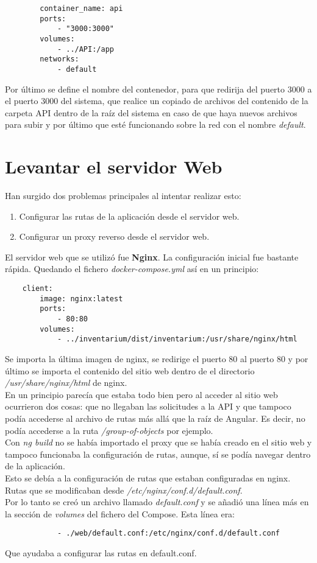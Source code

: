 \begin{verbatim}
        container_name: api
        ports:
            - "3000:3000"
        volumes:
            - ../API:/app
        networks:
            - default
\end{verbatim}
Por último se define el nombre del contenedor, para que redirija del puerto 3000 a el puerto 3000 del sistema, que realice un copiado de archivos del contenido de la carpeta API dentro de la raíz del sistema en caso de que haya nuevos archivos para subir y por último que esté funcionando sobre la red con el nombre \textit{default}.

\section{Levantar el servidor Web}
Han surgido dos problemas principales al intentar realizar esto:
\begin{enumerate}
    \item Configurar las rutas de la aplicación desde el servidor web.
    \item Configurar un proxy reverso desde el servidor web.
\end{enumerate}
El servidor web que se utilizó fue \textbf{Nginx}. La configuración inicial fue bastante rápida. Quedando el fichero \textit{docker-compose.yml} así en un principio:
\begin{verbatim}
    client:
        image: nginx:latest
        ports:
            - 80:80
        volumes:
            - ../inventarium/dist/inventarium:/usr/share/nginx/html
\end{verbatim}
Se importa la última imagen de nginx, se redirige el puerto 80 al puerto 80 y por último se importa el contenido del sitio web dentro de el directorio \textit{/usr/share/nginx/html} de nginx.
\\En un principio parecía que estaba todo bien pero al acceder al sitio web ocurrieron dos cosas: que no llegaban las solicitudes a la API y que tampoco podía accederse al archivo de rutas más allá que la raíz de Angular. Es decir, no podía accederse a la ruta \textit{/group-of-objects} por ejemplo.
\\Con \textit{ng build} no se había importado el proxy que se había creado en el sitio web y tampoco funcionaba la configuración de rutas, aunque, sí se podía navegar dentro de la aplicación.
\\Esto se debía a la configuración de rutas que estaban configuradas en nginx. Rutas que se modificaban desde \textit{/etc/nginx/conf.d/default.conf}.
\\Por lo tanto se creó un archivo llamado \textit{default.conf} y se añadió una línea más en la sección de \textit{volumes} del fichero del Compose. Esta línea era:
\begin{verbatim}
            - ./web/default.conf:/etc/nginx/conf.d/default.conf
\end{verbatim}
Que ayudaba a configurar las rutas en default.conf.

